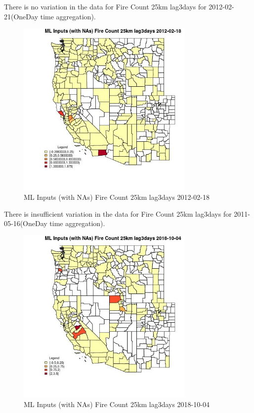There is no variation in the data for Fire Count 25km lag3days for 2012-02-21(OneDay time aggregation). 
 

\begin{figure} 
\centering  
\includegraphics[width=0.77\textwidth]{Code_Outputs/Report_ML_input_PM25_Step4_part_f_de_duplicated_aveswNAs_CountyFire_Count_25km_lag3daysMean2012-02-18.jpg} 
\caption{\label{fig:Report_ML_input_PM25_Step4_part_f_de_duplicated_aveswNAsCountyFire_Count_25km_lag3daysMean2012-02-18}ML Inputs (with NAs) Fire Count 25km lag3days 2012-02-18} 
\end{figure} 
 

There is insufficient variation in the data for Fire Count 25km lag3days for 2011-05-16(OneDay time aggregation). 
 

\begin{figure} 
\centering  
\includegraphics[width=0.77\textwidth]{Code_Outputs/Report_ML_input_PM25_Step4_part_f_de_duplicated_aveswNAs_CountyFire_Count_25km_lag3daysMean2018-10-04.jpg} 
\caption{\label{fig:Report_ML_input_PM25_Step4_part_f_de_duplicated_aveswNAsCountyFire_Count_25km_lag3daysMean2018-10-04}ML Inputs (with NAs) Fire Count 25km lag3days 2018-10-04} 
\end{figure} 
 

